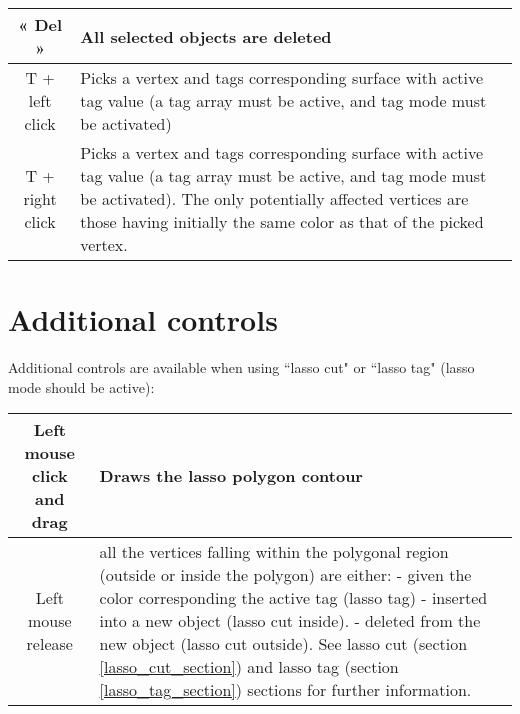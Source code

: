\begin{tabularx}{\linewidth}{ | c | X | }
« Del » & All selected objects are deleted \\ \hline			

T + left click & Picks a vertex and tags corresponding surface with active tag value (a tag array must be active, and tag mode must be activated)  \\ \hline			
 
T + right click & Picks a vertex and tags corresponding surface with active tag value (a tag array must be active, and tag mode must be activated). The only potentially affected vertices are those having initially the same color as that of the picked vertex.   \\ \hline			

 \end{tabularx}

\section{Additional controls}
Additional controls are available when using ``lasso cut" or ``lasso tag" (lasso mode should be active):\\
\begin{tabularx}{\linewidth}{ | c | X | }
\hline			
Left mouse click and drag & Draws  the lasso polygon contour\\ \hline			

Left mouse release &  all the vertices falling within the polygonal region (outside or inside the polygon) are either:\newline
- given the color corresponding the active tag (lasso tag)\newline
- inserted into a new object (lasso cut inside).\newline 
- deleted from the new object (lasso cut outside).\newline 
See lasso cut (section \ref{lasso_cut_section}) and lasso tag (section \ref{lasso_tag_section}) sections for further information.\\ \hline	
		

\end{tabularx}

